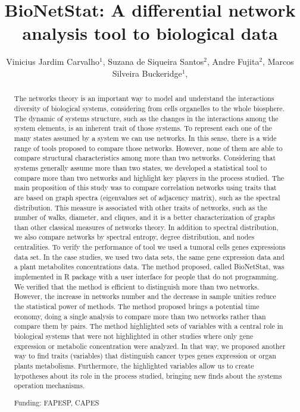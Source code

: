 \documentclass[twoside]{article}
\title{\vspace{-15mm}\fontsize{24pt}{10pt}\selectfont\textbf{ BioNetStat: A differential network analysis tool to biological data }} %
\author{ Vinicius Jardim Carvalho$^{1}$, Suzana de Siqueira Santos$^{2}$, Andre Fujita$^{2}$, Marcos Silveira Buckeridge$^{1}$, }
\affil{ 1 University of São Paulo

2 IME - USP

 }
\date{}
\begin{document}
  
  
  \maketitle %
  
  
  \thispagestyle{fancy} %
  
  
  \begin{abstract}
  The networks theory is an important way to model and understand the interactions diversity of biological systems, considering from cells organelles to the whole biosphere. The dynamic of systems structure, such as the changes in the interactions among the system elements, is an inherent trait of those systems. To represent each one of the many states assumed by a system we can use networks. In this sense, there is a wide range of tools proposed to compare those networks. However, none of them are able to compare structural characteristics among more than two networks. Considering that systems generally assume more than two states, we developed a statistical tool to compare more than two networks and highlight key players in the process studied. The main proposition of this study was to compare correlation networks using traits that are based on graph spectra (eigenvalues set of adjacency matrix), such as the spectral distribution. This measure is associated with other traits of networks, such as the number of walks, diameter, and cliques, and it is a better characterization of graphs than other classical measures of networks theory. In addition to spectral distribution, we also compare networks by spectral entropy, degree distribution, and nodes centralities. To verify the performance of tool we used a tumoral cells genes expressions data set. In the case studies, we used two data sets, the same gene expression data and a plant metabolites concentrations data. The method proposed, called BioNetStat, was implemented in R package with a user interface for people that do not programming. We verified that the method is efficient to distinguish more than two networks. However, the increase in networks number and the decrease in sample unities reduce the statistical power of methods. The method proposed brings a potential time economy, doing a single analysis to compare more than two networks rather than compare them by pairs. The method highlighted sets of variables with a central role in biological systems that were not highlighted in other studies where only gene expression or metabolic concentration were analyzed. In that way, we proposed another way to find traits (variables) that distinguish cancer types genes expression or organ plants metabolisms. Furthermore, the highlighted variables allow us to create hypotheses about its role in the process studied, bringing new finds about the systems operation mechanisms.
  
  Funding: FAPESP, CAPES \\ 
  \end{abstract}
  
\end{document}
